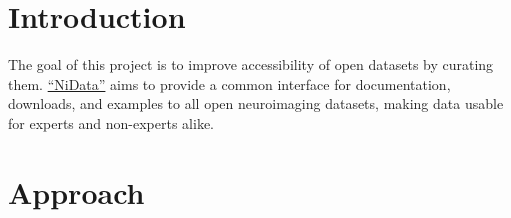 \documentclass[twocolumn]{bmcart}%
\begin{document}
\begin{frontmatter}
\begin{fmbox}

	








%
\end{fmbox}%

\end{frontmatter}


\section{Introduction}\label{introduction}

The goal of this project is to improve accessibility of open datasets by
curating them. \href{http://github.com/nidata/nidata}{``NiData''} aims
to provide a common interface for documentation, downloads, and examples
to all open neuroimaging datasets, making data usable for experts and
non-experts alike.

\section{Approach}\label{approach}
\end{document}
